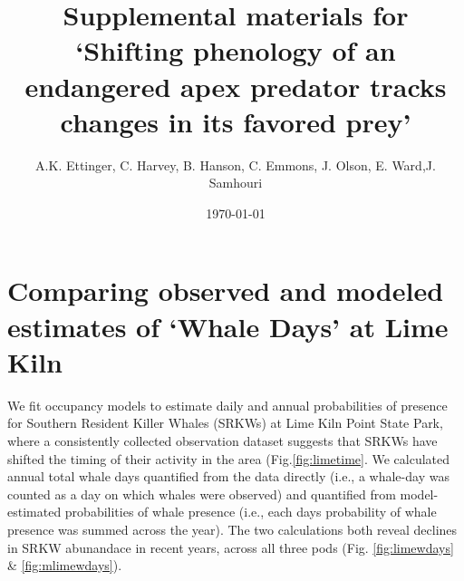 \documentclass{article}
\begin{document}



\title{Supplemental materials for `Shifting phenology of an endangered apex predator tracks changes in its favored prey'}
\date{\today}
\maketitle
\author{A.K. Ettinger, C. Harvey, B. Hanson, C. Emmons, J. Olson, E. Ward,J. Samhouri}
\renewcommand{\thetable}{S\arabic{table}}
\renewcommand{\thefigure}{S\arabic{figure}}

\section* {Comparing observed and modeled estimates of `Whale Days' at Lime Kiln}
\par We fit occupancy models to estimate daily and annual probabilities of presence for Southern Resident Killer Whales (SRKWs) at Lime Kiln Point State Park, where a consistently collected observation dataset suggests that SRKWs have shifted the timing of their activity in the area (Fig.\ref{fig:limetime}. We calculated annual total whale days quantified from the data directly (i.e., a whale-day was counted as a day on which whales were observed) and quantified from model-estimated probabilities of whale presence (i.e., each days probability of whale presence was summed across the year). The two calculations both reveal declines in SRKW abunandace in recent years, across all three pods (Fig. \ref{fig:limewdays} \& \ref{fig:mlimewdays}). 
\end{document}

